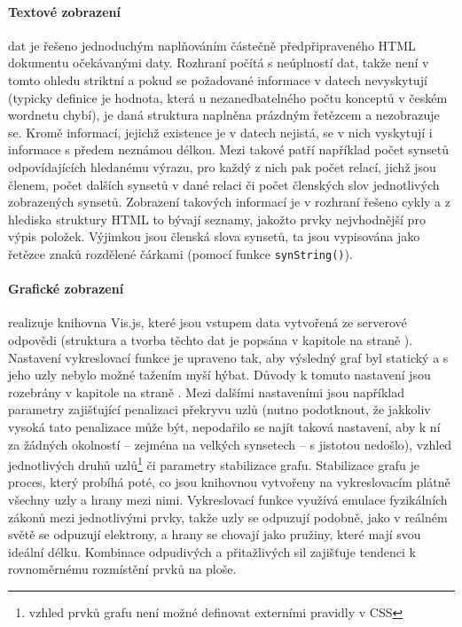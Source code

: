 \documentclass[a4paper, 11pt, oneside]{book}
\newcommand{\itNameRef}[1]{\textit{\nameref{#1}}}
\begin{document}
				\paragraph{Textové zobrazení} dat je řešeno jednoduchým naplňováním částečně předpřipraveného HTML dokumentu očekávanými daty. Rozhraní počítá s neúplností dat, takže není v tomto ohledu striktní a pokud se požadované informace v datech nevyskytují (typicky definice je hodnota, která u nezanedbatelného počtu konceptů v českém wordnetu chybí), je daná struktura naplněna prázdným řetězcem a nezobrazuje se. Kromě informací, jejichž existence je v datech nejistá, se v nich vyskytují i informace s předem neznámou délkou. Mezi takové patří například počet synsetů odpovídajících hledanému výrazu, pro každý z nich pak počet relací, jichž jsou členem, počet dalších synsetů v dané relaci či počet členských slov jednotlivých zobrazených synsetů. Zobrazení takových informací je v rozhraní řešeno cykly a z hlediska struktury HTML to bývají seznamy, jakožto prvky nejvhodnější pro výpis položek. Výjimkou jsou členská slova synsetů, ta jsou vypisována jako řetězce znaků rozdělené čárkami (pomocí funkce \texttt{synString()}).

				\paragraph{Grafické zobrazení} realizuje knihovna Vis.js, které jsou vstupem data vytvořená ze serverové odpovědi (struktura a tvorba těchto dat je popsána v kapitole \itNameRef{cha:zpracovani} na straně \pageref{cha:zpracovani}). Nastavení vykreslovací funkce je upraveno tak, aby výsledný graf byl statický a s jeho uzly nebylo možné tažením myší hýbat. Důvody k tomuto nastavení jsou rozebrány v kapitole \itNameRef{cha:navrh} na straně \pageref{cha:shrnuti-prehledu}. Mezi dalšími nastaveními jsou například parametry zajišťující penalizaci překryvu uzlů (nutno podotknout, že jakkoliv vysoká tato penalizace může být, nepodařilo se najít taková nastavení, aby k ní za žádných okolností -- zejména na velkých synsetech -- s jistotou nedošlo), vzhled jednotlivých druhů uzlů\footnote{vzhled prvků grafu není možné definovat externími pravidly v CSS} či parametry stabilizace grafu. Stabilizace grafu je proces, který probíhá poté, co jsou knihovnou vytvořeny na vykreslovacím plátně všechny uzly a hrany mezi nimi. Vykreslovací funkce využívá emulace fyzikálních zákonů mezi jednotlivými prvky, takže uzly se odpuzují podobně, jako v reálném světě se odpuzují elektrony, a hrany se chovají jako pružiny, které mají svou ideální délku. Kombinace odpudivých a přitažlivých sil zajišťuje tendenci k rovnoměrnému rozmístění prvků na ploše.
\end{document}
